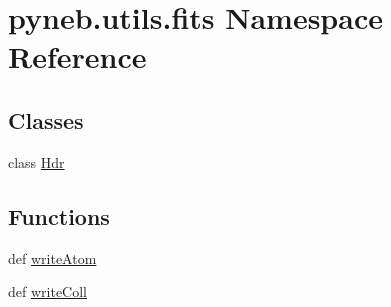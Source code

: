 \hypertarget{namespacepyneb_1_1utils_1_1fits}{\section{pyneb.\-utils.\-fits Namespace Reference}
\label{namespacepyneb_1_1utils_1_1fits}
}
\subsection*{Classes}
\begin{DoxyCompactItemize}
\item 
class \hyperlink{classpyneb_1_1utils_1_1fits_1_1_hdr}{Hdr}
\end{DoxyCompactItemize}
\subsection*{Functions}
\begin{DoxyCompactItemize}
\item 
def \hyperlink{namespacepyneb_1_1utils_1_1fits_a8055efc148e2aef26439d0a79a26549b}{write\-Atom}
\item 
def \hyperlink{namespacepyneb_1_1utils_1_1fits_a468ecdfaa21de61a1037128ee889fd76}{write\-Coll}
\end{DoxyCompactItemize}


